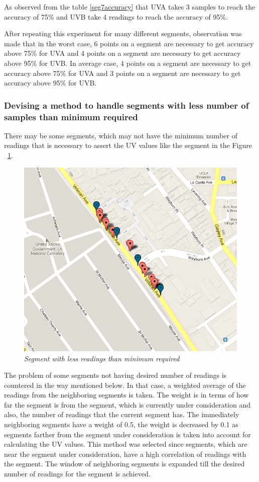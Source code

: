 \documentclass[12pt,fullpage,doublespace]{article}
\begin{document}
As observed from the table \ref{seg7accuracy} that UVA takes 3 samples to reach the accuracy of 75\% and UVB take 4 readings to reach the accuracy of 95\%. 
\newpage


\newpage
After repeating this experiment for many different segments, observation was made that in the worst case, 6 points on a segment are necessary to get accuracy above 75\% for UVA and 4 points on a segment are necessary to get accuracy above 95\% for UVB.
In average case, 4 points on a segment are necessary to get accuracy above 75\% for UVA and  3 points on a segment are necessary to get accuracy above 95\% for UVB.


\subsubsection{Devising a method to handle segments with less number of samples than minimum required}
There may be some segments, which may not have the minimum number of readings that is necessary to assert the UV values like the segment in the Figure ~\ref{fig:lessReadings}. 
\begin{figure}
\begin{center}
\includegraphics[scale=0.35]{lessReadings.png}
\caption{\small \sl Segment with less readings than minimum required}
\label{fig:lessReadings}
\end{center}
\end{figure}
The problem of some segments not having desired number of readings is countered in the way mentioned below. In that case, a weighted average of the readings from the neighboring segments is taken. The weight is in terms of how far the segment is from the segment, which is currently under consideration and also, the number of readings that the current segment has. The immediately neighboring segments have a weight of 0.5, the weight is decreased by 0.1 as segments farther from the segment under consideration is taken into account for calculating the UV values. This method was selected since segments, which are near the segment under consideration, have a high correlation of readings with the segment. The window of neighboring segments is expanded till the desired number of readings for the segment is achieved. 
\end{document}
